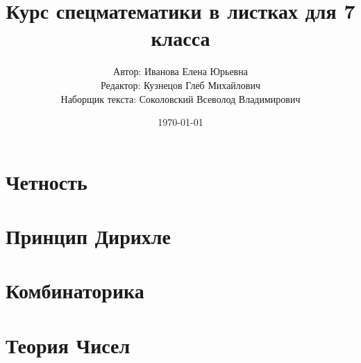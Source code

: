 \documentclass[11pt,a4paper]{report}
\title{Курс спецматематики в листках для 7 класса}
\author{Автор: Иванова Елена Юрьевна\\
	Редактор: Кузнецов Глеб Михайлович\\
	Наборщик текста: Соколовский Всеволод Владимирович}
\date{\today}
\theoremstyle{myrmk}
\theoremstyle{mypln}
\theoremstyle{mydfn}
\begin{document}
		\maketitle
		\tableofcontents
		\newpage

\chapter{Четность}









\chapter{Принцип Дирихле}



\chapter{Комбинаторика}




\chapter{Теория Чисел}



\end{document}
